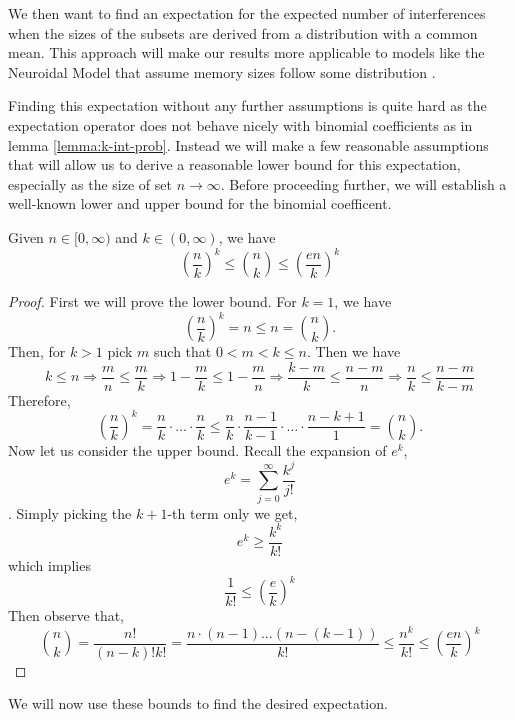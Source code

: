 We then want to find an expectation for the expected number of interferences when the sizes of the subsets are derived from a distribution with a common mean. This approach will make our results more applicable to models like the Neuroidal Model that assume memory sizes follow some distribution \cite{valiant2005memorization}. 

Finding this expectation without any further assumptions is quite hard as the expectation operator does not behave nicely with binomial coefficients as in lemma \ref{lemma:k-int-prob}. Instead we will make a few reasonable assumptions that will allow us to derive a reasonable lower bound for this expectation, especially as the size of set $n \to \infty$. Before proceeding further, we will establish a well-known lower and upper bound for the binomial coefficent. 

\begin{lemma}
\label{lemma:binomial-lower-bound}
Given $n \in [0, \infty)$ and $ k \in (0, \infty)$, we have
$$
\left(\frac{n}{k}\right)^{k} \le {n \choose k} \le \left(\frac{en}{k}\right)^{k}
$$
\end{lemma}
\begin{proof}
    First we will prove the lower bound. 
    For $k=1$, we have $$\left( \frac{n}{k} \right)^k = n \leq n = \binom{n}{k}.$$ Then, for $k > 1$ pick $m$ such that $0 < m < k \le n$. Then we have 
    $$
    k \leq n \Rightarrow \frac{m}{n} \leq \frac{m}{k} \Rightarrow 1 - \frac{m}{k} \leq 1- \frac{m}{n} \Rightarrow \frac{k-m}{k} \leq \frac{n-m}{n} \Rightarrow \frac{n}{k} \leq \frac{n-m}{k-m}
    $$
    Therefore,
    $$
    \left( \frac{n}{k} \right)^k = \frac{n}{k} \cdot \ldots \cdot \frac{n}{k} \leq \frac{n}{k} \cdot \frac{n-1}{k-1} \cdot \ldots \cdot \frac{n-k+1}{1} = \binom{n}{k}.
    $$
    Now let us consider the upper bound.
    Recall the expansion of $e^k$, $$e^k=\sum_{j=0}^{\infty}\frac{k^j}{j!}$$. Simply picking the $k+1$-th term only we get,
    $$
    e^k \ge \frac{k^k}{k!}
    $$
    which implies
    $$
    \frac{1}{k!} \le \left(\frac{e}{k}\right)^k
    $$
    Then observe that, 
    $$
    {n \choose k} = \frac{n!}{(n-k)! k!} = \frac{n \cdot (n-1) \dots (n-(k-1))}{k!} \le \frac{n^k}{k!} \le \left(\frac{en}{k}\right)^{k}
    $$
\end{proof}

We will now use these bounds to find the desired expectation.

